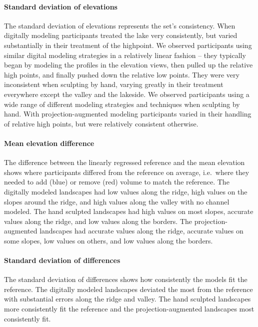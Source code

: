 \documentclass[prodmode,acmtochi]{acmsmall} %
\begin{document}
\paragraph{Standard deviation of elevations}
The standard deviation of elevations represents the set's consistency.
%
When digitally modeling 
participants treated the lake very consistently, but 
varied substantially in their treatment of the highpoint.
%
We observed participants 
using similar digital modeling strategies 
in a relatively linear fashion -- 
they typically began by modeling the profiles in the elevation views,
then pulled up the relative high points, 
and finally pushed down the relative low points. 
They were very inconsistent 
when sculpting by hand,
varying greatly in their treatment 
everywhere except the valley and the lakeside.
%
We observed participants using 
a wide range of different modeling strategies
and techniques
when sculpting by hand. 
%
With projection-augmented modeling 
participants varied in their handling of relative high points, 
but were relatively consistent otherwise. 

\paragraph{Mean elevation difference}
The difference between the linearly regressed reference and the mean elevation
shows where participants 
differed from the reference on average, i.e.~where they 
needed to add (blue) or remove (red) volume to match the reference. 
%
The digitally modeled landscapes 
had low values along the ridge,
high values on the slopes around the ridge,
and high values along the valley
with no channel modeled.
% 
The hand sculpted landscapes 
had high values on most slopes,
accurate values along the ridge, 
and low values along the borders.
%
The projection-augmented landscapes 
had accurate values along the ridge,
accurate values on some slopes, 
low values on others, 
and low values along the borders.

\paragraph{Standard deviation of differences}
The standard deviation of differences shows 
how consistently the models fit the reference. 
%
The digitally modeled landscapes deviated the most from the reference
with substantial errors along the ridge and valley. 
%
The hand sculpted landscapes 
more consistently fit the reference
and
the projection-augmented landscapes 
most consistently fit. 
\end{document}
